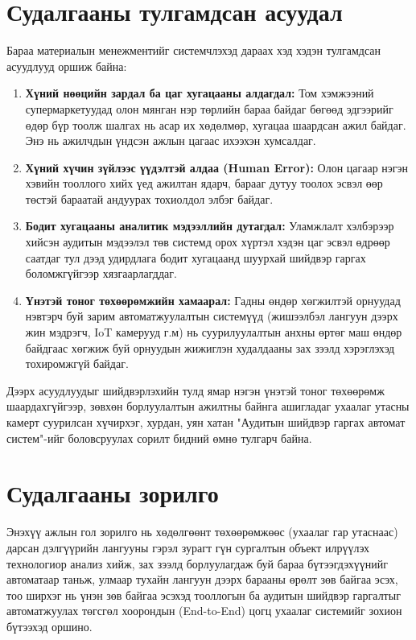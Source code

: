 \section{Судалгааны тулгамдсан асуудал}
Бараа материалын менежментийг системчлэхэд дараах хэд хэдэн тулгамдсан асуудлууд оршиж байна:
\begin{enumerate}
    \item \textbf{Хүний нөөцийн зардал ба цаг хугацааны алдагдал:} Том хэмжээний супермаркетуудад олон мянган нэр төрлийн бараа байдаг бөгөөд эдгээрийг өдөр бүр тоолж шалгах нь асар их хөдөлмөр, хугацаа шаардсан ажил байдаг. Энэ нь ажилчдын үндсэн ажлын цагаас ихээхэн хумсалдаг.
    \item \textbf{Хүний хүчин зүйлээс үүдэлтэй алдаа (Human Error):} Олон цагаар нэгэн хэвийн тооллого хийх үед ажилтан ядарч, барааг дутуу тоолох эсвэл өөр төстэй бараатай андуурах тохиолдол элбэг байдаг.
    \item \textbf{Бодит хугацааны аналитик мэдээллийн дутагдал:} Уламжлалт хэлбэрээр хийсэн аудитын мэдээлэл төв системд орох хүртэл хэдэн цаг эсвэл өдрөөр саатдаг тул дээд удирдлага бодит хугацаанд шуурхай шийдвэр гаргах боломжгүйгээр хязгаарлагддаг.
    \item \textbf{Үнэтэй тоног төхөөрөмжийн хамаарал:} Гадны өндөр хөгжилтэй орнуудад нэвтэрч буй зарим автоматжуулалтын системүүд (жишээлбэл лангуун дээрх жин мэдрэгч, IoT камерууд г.м) нь суурилуулалтын анхны өртөг маш өндөр байдгаас хөгжиж буй орнуудын жижиглэн худалдааны зах зээлд хэрэглэхэд тохиромжгүй байдаг.
\end{enumerate}

Дээрх асуудлуудыг шийдвэрлэхийн тулд ямар нэгэн үнэтэй тоног төхөөрөмж шаардахгүйгээр, зөвхөн борлуулалтын ажилтны байнга ашигладаг ухаалаг утасны камерт суурилсан хүчирхэг, хурдан, уян хатан "Аудитын шийдвэр гаргах автомат систем"-ийг боловсруулах сорилт бидний өмнө тулгарч байна.

\section{Судалгааны зорилго}
Энэхүү ажлын гол зорилго нь хөдөлгөөнт төхөөрөмжөөс (ухаалаг гар утаснаас) дарсан дэлгүүрийн лангууны гэрэл зурагт гүн сургалтын объект илрүүлэх технологиор анализ хийж, зах зээлд борлуулагдаж буй бараа бүтээгдэхүүнийг автоматаар таньж, улмаар тухайн лангуун дээрх барааны өрөлт зөв байгаа эсэх, тоо ширхэг нь үнэн зөв байгаа эсэхэд тооллогын ба аудитын шийдвэр гаргалтыг автоматжуулах төгсгөл хоорондын (End-to-End) цогц ухаалаг системийг зохион бүтээхэд оршино.

